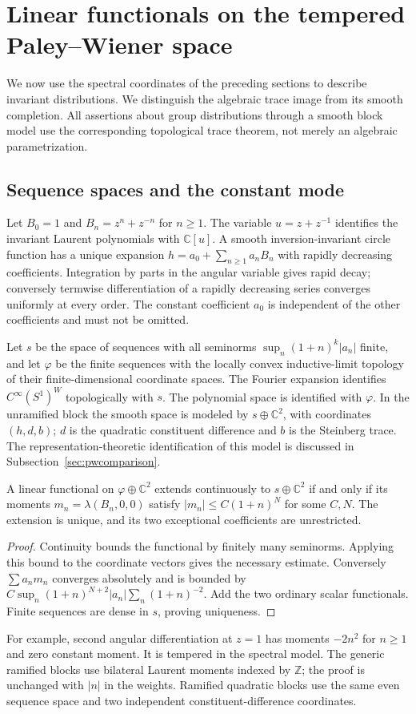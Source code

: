 \section{Linear functionals on the tempered Paley--Wiener space}\label{sec:tempered-duality}
We now use the spectral coordinates of the preceding sections to describe invariant distributions. We distinguish the algebraic trace image from its smooth completion. All assertions about group distributions through a smooth block model use the corresponding topological trace theorem, not merely an algebraic parametrization.

\subsection{Sequence spaces and the constant mode}
Let $B_0=1$ and $B_n=z^n+z^{-n}$ for $n\ge1$. The variable $u=z+z^{-1}$ identifies the invariant Laurent polynomials with $\mathbb C[u]$. A smooth inversion-invariant circle function has a unique expansion $h=a_0+\sum_{n\ge1}a_nB_n$ with rapidly decreasing coefficients. Integration by parts in the angular variable gives rapid decay; conversely termwise differentiation of a rapidly decreasing series converges uniformly at every order. The constant coefficient $a_0$ is independent of the other coefficients and must not be omitted.

Let $s$ be the space of sequences with all seminorms $\sup_n(1+n)^k|a_n|$ finite, and let $\varphi$ be the finite sequences with the locally convex inductive-limit topology of their finite-dimensional coordinate spaces. The Fourier expansion identifies $C^\infty(S^1)^W$ topologically with $s$. The polynomial space is identified with $\varphi$. In the unramified block the smooth space is modeled by $s\oplus\mathbb C^2$, with coordinates $(h,d,b)$; $d$ is the quadratic constituent difference and $b$ is the Steinberg trace. The representation-theoretic identification of this model is discussed in Subsection~\ref{sec:pwcomparison}.

\begin{theorem}\label{thm:duality-moments}
A linear functional on $\varphi\oplus\mathbb C^2$ extends continuously to $s\oplus\mathbb C^2$ if and only if its moments $m_n=\lambda(B_n,0,0)$ satisfy $|m_n|\le C(1+n)^N$ for some $C,N$. The extension is unique, and its two exceptional coefficients are unrestricted.
\end{theorem}
\begin{proof}
Continuity bounds the functional by finitely many seminorms. Applying this bound to the coordinate vectors gives the necessary estimate. Conversely $\sum a_nm_n$ converges absolutely and is bounded by $C\sup_n(1+n)^{N+2}|a_n|\sum_n(1+n)^{-2}$. Add the two ordinary scalar functionals. Finite sequences are dense in $s$, proving uniqueness.
\end{proof}
For example, second angular differentiation at $z=1$ has moments $-2n^2$ for $n\ge1$ and zero constant moment. It is tempered in the spectral model. The generic ramified blocks use bilateral Laurent moments indexed by $\mathbb Z$; the proof is unchanged with $|n|$ in the weights. Ramified quadratic blocks use the same even sequence space and two independent constituent-difference coordinates.

